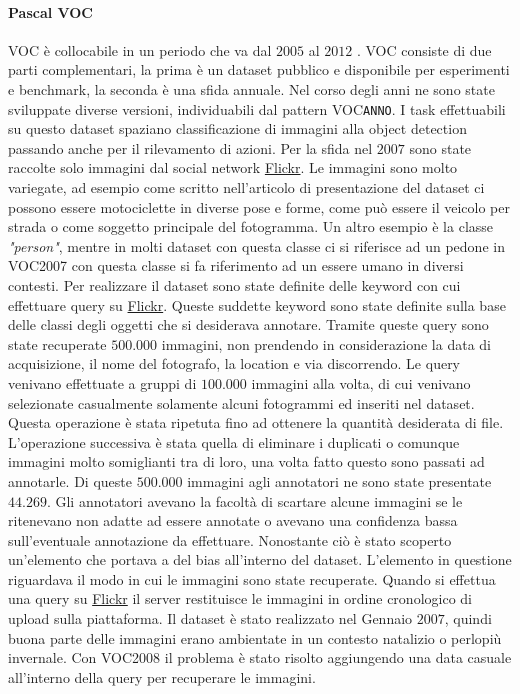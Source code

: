 \paragraph{Pascal VOC}
\ac{VOC} è collocabile in un periodo che va dal $2005$ al $2012$ \cite{everingham2010pascal, everingham2015pascal}. \ac{VOC} consiste di due parti complementari, la prima è un dataset pubblico e disponibile per esperimenti e benchmark, la seconda è una sfida annuale. Nel corso degli anni ne sono state sviluppate diverse versioni, individuabili dal pattern VOC\texttt{ANNO}. I task effettuabili su questo dataset spaziano classificazione di immagini alla object detection passando anche per il rilevamento di azioni. 
Per la sfida nel $2007$ sono state raccolte solo immagini dal social network \href{https://www.flickr.com/}{Flickr}. Le immagini sono molto variegate, ad esempio come scritto nell'articolo di presentazione del dataset \cite{everingham2010pascal} ci possono essere motociclette in diverse pose e forme, come può essere il veicolo per strada o come soggetto principale del fotogramma. 
Un altro esempio è la classe \textit{"person"}, mentre in molti dataset con questa classe ci si riferisce ad un pedone in VOC2007 con questa classe si fa riferimento ad un essere umano in diversi contesti. 
Per realizzare il dataset sono state definite delle keyword con cui effettuare query su \href{https://www.flickr.com/}{Flickr}. Queste suddette keyword sono state definite sulla base delle classi degli oggetti che si desiderava annotare. Tramite queste query sono state recuperate $500.000$ immagini, non prendendo in considerazione la data di acquisizione, il nome del fotografo, la location e via discorrendo. 
Le query venivano effettuate a gruppi di $100.000$ immagini alla volta, di cui venivano selezionate casualmente solamente alcuni fotogrammi ed inseriti nel dataset. Questa operazione è stata ripetuta fino ad ottenere la quantità desiderata di file. 
L'operazione successiva è stata quella di eliminare i duplicati o comunque immagini molto somiglianti tra di loro, una volta fatto questo sono passati ad annotarle. Di queste $500.000$ immagini agli annotatori ne sono state presentate $44.269$. Gli annotatori avevano la facoltà di scartare alcune immagini se le ritenevano non adatte ad essere annotate o avevano una confidenza bassa sull'eventuale annotazione da effettuare. Nonostante ciò è stato scoperto un'elemento che portava a del bias all'interno del dataset. L'elemento in questione riguardava il modo in cui le immagini sono state recuperate. Quando si effettua una query su \href{https://www.flickr.com/}{Flickr} il server restituisce le immagini in ordine cronologico di upload sulla piattaforma. Il dataset è stato realizzato nel Gennaio $2007$, quindi buona parte delle immagini erano ambientate in un contesto natalizio o perlopiù invernale. Con VOC2008 il problema è stato risolto aggiungendo una data casuale all'interno della query per recuperare le immagini.  

